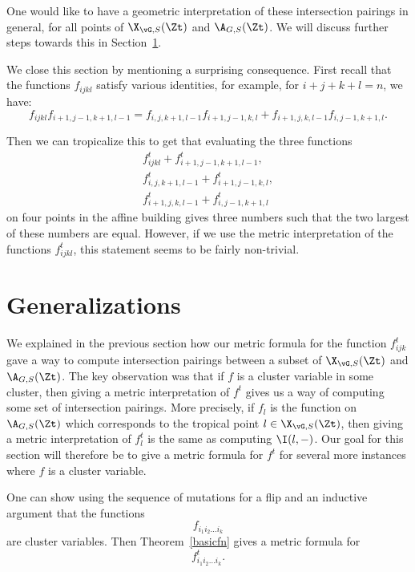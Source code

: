 One would like to have a geometric interpretation of these intersection pairings in general, for all points of $\X_{\vG,S}(\Zt)$ and $\A_{G,S}(\Zt)$. We will discuss further steps towards this in Section~\ref{sect6}.

\begin{rema} We close this section by mentioning a surprising consequence. First recall that the functions $f_{ijkl}$ satisfy various identities, for example, for $i+j+k+l=n$, we have:
\[
f_{ijkl} f_{i+1, j-1, k+1, l-1} = f_{i, j, k+1, l-1} f_{i+1, j-1, k, l} + f_{i+1, j, k, l-1} f_{i, j-1, k+1, l}.
\]

Then we can tropicalize this to get that evaluating the three functions
\begin{gather*}
f^t_{ijkl} + f^t_{i+1, j-1, k+1, l-1},
\\
f^t_{i, j, k+1, l-1} + f^t_{i+1, j-1, k, l},
\\
f^t_{i+1, j, k, l-1} + f^t_{i, j-1, k+1, l}
\end{gather*}
on four points in the affine building gives three numbers such that the two largest of these numbers are equal. However, if we use the metric interpretation of the functions $f^t_{ijkl}$, this statement seems to be fairly non-trivial.
\end{rema}

\section{Generalizations}\label{sect6}

We explained in the previous section how our metric formula for the function $f_{ijk}^t$ gave a way to compute intersection pairings between a subset of $\X_{\vG,S}(\Zt)$ and $\A_{G,S}(\Zt)$. The key observation was that if $f$ is a cluster variable in some cluster, then giving a metric interpretation of $f^t$ gives us a way of computing some set of intersection pairings. More precisely, if $f_l$ is the function on $\A_{G,S}(\Zt)$ which corresponds to the tropical point $l \in \X_{\vG,S}(\Zt)$, then giving a metric interpretation of $f_l^t$ is the same as computing $\I(l, -)$. Our goal for this section will therefore be to give a metric formula for $f^t$ for several more instances where $f$ is a cluster variable.

One can show using the sequence of mutations for a flip and an inductive argument that the functions 
\[
f_{i_1i_2\dots i_k}
\]
are cluster variables. Then Theorem~\ref{basicfn} gives a metric formula for 
\[
f_{i_1i_2\dots i_k}^t.
\]

